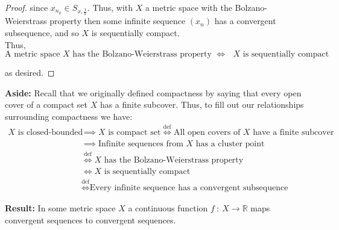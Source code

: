 \documentclass[12pt]{article}
\newcommand{\R}{\mathbb R}
\begin{document}
\begin{proof}
since $x_{n_k} \in S_{x,\frac{1}{k}}$. Thus, with $X$ a metric space with the Bolzano-Weierstrass property then some infinite sequence $(x_n)$ has a convergent subsequence, and so $X$ is sequentially compact. \\

Thus,
\begin{equation*}
	\text{A metric space $X$ has the Bolzano-Weierstrass property $\iff$ $X$ is sequentially compact}
\end{equation*}

as desired.
\end{proof}

%
%
{\bf Aside:} Recall that we originally defined compactness by saying that every open cover of a compact set $X$ has a finite subcover. Thus, to fill out our relationships surrounding compactness we have:
\begin{align*}
	\text{$X$ is closed-bounded} &\implies \text{$X$ is compact set} \stackrel{\text{def}}{\iff} \text{All open covers of $X$ have a finite subcover}\\
	&\implies \text{Infinite sequences from $X$ has a cluster point} \\
	&\stackrel{\text{def}}{\iff} \text{$X$ has the Bolzano-Weierstrass property} \\
	&\iff \text{$X$ is sequentially compact} \\
	&\stackrel{\text{def}}{\iff} \text{Every infinite sequence has a convergent subsequence}
\end{align*}

%
%
{\bf Result:} In some metric space $X$ a continuous function $f~:~X\to\R$ maps convergent sequences to convergent sequences. \\
\end{document}
